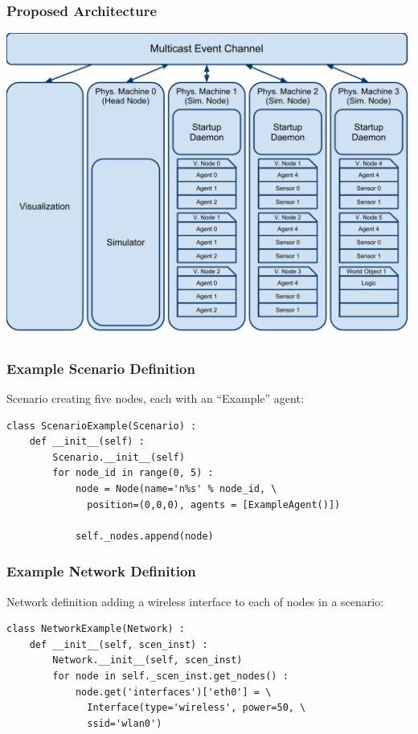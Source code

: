 \documentclass[mathserif]{beamer}
\begin{document}
\frame
{
    \frametitle{Proposed Architecture}
    \begin{center}
        \includegraphics[scale=.5]{CTUSeminar.pdf}
    \end{center}
}

\begin{frame}[fragile]
    \frametitle{Example Scenario Definition}
    Scenario creating five nodes, each with an ``Example'' agent:
    {\footnotesize
    \begin{verbatim}
class ScenarioExample(Scenario) :
    def __init__(self) :
        Scenario.__init__(self)
        for node_id in range(0, 5) :
            node = Node(name='n%s' % node_id, \
              position=(0,0,0), agents = [ExampleAgent()])
            
            self._nodes.append(node)
    \end{verbatim}}
\end{frame}

\begin{frame}[fragile]
    \frametitle{Example Network Definition}
    Network definition adding a wireless interface to each of nodes in a scenario:
    {\footnotesize
    \begin{verbatim}
class NetworkExample(Network) :
    def __init__(self, scen_inst) :
        Network.__init__(self, scen_inst)
        for node in self._scen_inst.get_nodes() :
            node.get('interfaces')['eth0'] = \
              Interface(type='wireless', power=50, \
              ssid='wlan0')
    \end{verbatim}}
\end{frame}
\end{document}
